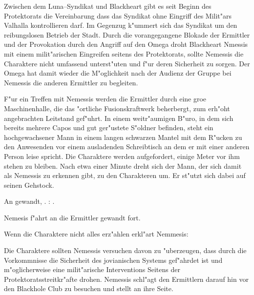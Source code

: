 Zwischen dem Luna--Syndikat und Blackheart gibt es seit Beginn des Protektorats die Vereinbarung dass das Syndikat ohne Eingriff des Milit"ars Valhalla kontrollieren darf. Im Gegenzug k"ummert sich das Syndikat um den reibungslosen Betrieb der Stadt. Durch die  vorangegangene Blokade der Ermittler und der Provokation durch den Angriff auf den Omega droht Blackheart Nmessis mit einem milit"arischen Eingreifen seitens des Protektorats, sollte Nemessis die Charaktere nicht umfassend unterst"uten und f"ur deren Sicherheit zu sorgen. Der Omega hat damit wieder die M"oglichkeit nach der Audienz der Gruppe bei Nemessis die anderen Ermittler zu begleiten.



F"ur ein Treffen mit Nemessis werden die Ermittler durch eine gro\3e Maschinenhalle, die das "ortliche Fusionskraftwerk beherbergt, zum erh"oht angebrachten Leitstand gef"uhrt. In einem weitr"aumigen B"uro, in dem sich bereits mehrere Capos und gut ger"ustete S"oldner befinden, steht ein hochgewachsener Mann in einem langen schwarzen Mantel mit dem R"ucken zu den Anwesenden vor einem ausladenden Schreibtisch an dem er mit einer anderen Person leise spricht. Die Charaktere werden aufgefordert, einige Meter vor ihm stehen zu bleiben. Nach etwa einer Minute dreht sich der Mann, der sich damit als Nemessis zu erkennen gibt, zu den Charakteren um. Er st"utzt sich dabei auf seinen Gehstock.


An \xl{} gewandt, . \xl{}:  . 

Nemesis f"ahrt an die Ermittler gewandt fort. 


Wenn die Charaktere nicht alles erz"ahlen erkl"art Nemmesis:


Die Charaktere sollten Nemessis versuchen davon zu "uberzeugen, dass durch die Vorkommnisse die Sicherheit des jovianischen Systems gef"ahrdet ist und m"oglicherweise eine milit"arische Interventions Seitens der Protektoratsstreitkr"afte drohen. Nemessis schl"agt den Ermittlern darauf hin vor den Blackhole Club zu besuchen und stellt \xl{} an ihre Seite.

